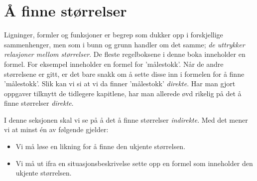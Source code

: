 




\section{Å finne størrelser}
Ligninger, formler og funksjoner er begrep som dukker opp i forskjellige sammenhenger, men som i bunn og grunn handler om det samme; \textsl{de uttrykker relasjoner mellom størrelser}. De fleste regelboksene i denne boka inneholder en formel. For eksempel inneholder  en formel for 'målestokk'. Når de andre størrelsene er gitt, er det bare snakk om å sette disse inn i formelen for å finne 'målestokk'. Slik kan vi si at vi da finner 'målestokk' \textsl{direkte}. Har man gjort oppgaver tilknytt de tidlegere kapitlene, har man allerede øvd rikelig på det å finne størrelser \textsl{direkte}.\vsk

I denne seksjonen skal vi se på å det å finne størrelser \textsl{indirekte}. Med det mener vi at minst én av følgende gjelder:
\begin{itemize}
	\item Vi må løse en likning for å finne den ukjente størrelsen.
	\item Vi må ut ifra en situasjonsbeskrivelse sette opp en formel som inneholder den ukjente størrelsen.
\end{itemize}



